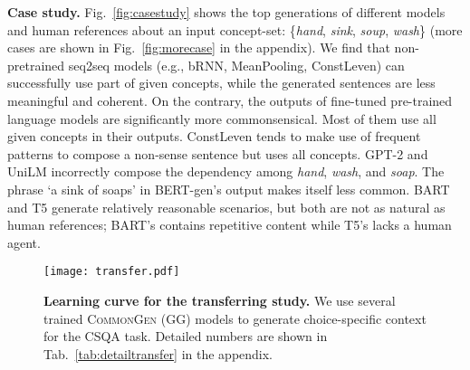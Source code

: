 \documentclass[11pt,a4paper]{article}
\begin{document}
	\smallskip
	\noindent
	\textbf{Case study.}	
    Fig.~\ref{fig:casestudy} shows the top generations of different models and human references about an input concept-set:  \{\textit{hand}, \textit{sink}, \textit{soup}, \textit{wash}\} (more cases are shown in Fig.~\ref{fig:morecase} in the appendix). 
We find that non-pretrained seq2seq models (e.g., bRNN, MeanPooling, ConstLeven) can successfully use part of given concepts, while the generated sentences are less meaningful and coherent.
On the contrary, the outputs of fine-tuned pre-trained language models are significantly more commonsensical.
Most of them use all given concepts in their outputs.
    ConstLeven tends to make use of frequent patterns to compose a non-sense sentence but uses all concepts.
    GPT-2 and UniLM incorrectly compose the dependency among \textit{hand}, \textit{wash}, and \textit{soap}.
    The phrase `a sink of soaps' in BERT-gen's output makes itself less common.
    BART and T5 generate relatively reasonable scenarios, but both are not as natural as human references; BART's contains repetitive content while T5's lacks a human agent.
    
    \begin{figure}[t!]
		\centering
		\texttt{[image: transfer.pdf]}
		\caption{{\textbf{Learning curve for the transferring study.} We use several trained \textsc{CommonGen} (GG) models to generate choice-specific context for the CSQA task.  Detailed numbers are shown in Tab.~\ref{tab:detailtransfer} in the appendix.
}}
		\label{fig:learncurve}
	\end{figure}
	
	
 
\begin{table*}[th!]
	\centering
	\caption{Experimental results of models with DBA decoding method on the test set.}
	\label{tab:dbaexp}
\end{table*} 
\end{document}
